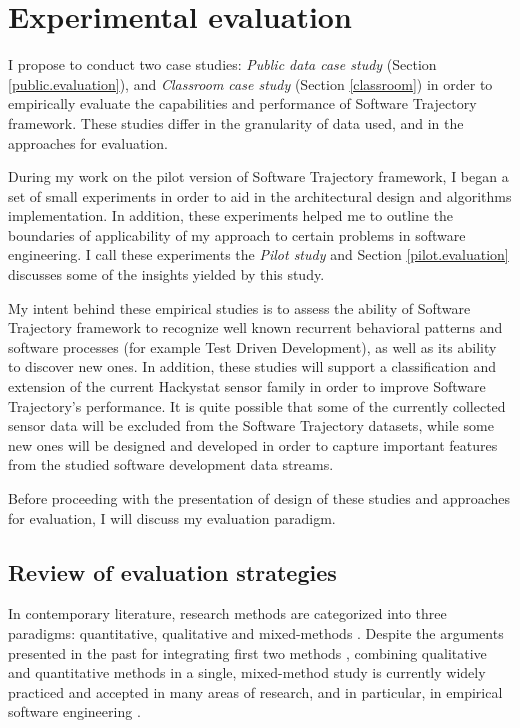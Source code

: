 \chapter{Experimental evaluation} \label{experiments}
I propose to conduct two case studies: \textit{Public data case study} (Section \ref{public.evaluation}), and \textit{Classroom case study} (Section \ref{classroom}) in order to empirically evaluate the capabilities and performance of Software Trajectory framework. These studies differ in the granularity of data used, and in the approaches for evaluation. 

During my work on the pilot version of Software Trajectory framework, I began a set of small experiments in order to aid in the architectural design and algorithms implementation. In addition, these experiments helped me to outline the boundaries of applicability of my approach to certain problems in software engineering. I call these experiments the \textit{Pilot study} and Section \ref{pilot.evaluation} discusses some of the insights yielded by this study.

My intent behind these empirical studies is to assess the ability of Software Trajectory framework to recognize well known recurrent behavioral patterns and software processes (for example Test Driven Development), as well as its ability to discover new ones. In addition, these studies will support a classification and extension of the current Hackystat sensor family in order to improve Software Trajectory's performance. It is quite possible that some of the currently collected sensor data will be excluded from the Software Trajectory datasets, while some new ones will be designed and developed in order to capture important features from the studied software development data streams. 

Before proceeding with the presentation of design of these studies and approaches for evaluation, I will discuss my evaluation paradigm.

\section{Review of evaluation strategies}
In contemporary literature, research methods are categorized into three paradigms: quantitative, qualitative and mixed-methods  \cite{citeulike:5410262}. Despite the arguments presented in the past for integrating first two methods \cite{GubaLincoln-CompetingParadigms}, combining qualitative and quantitative methods in a single, mixed-method study is currently widely practiced and accepted in many areas of research, and in particular, in empirical software engineering \cite{citeulike:5361927} \cite{citeulike:5361791}. 

